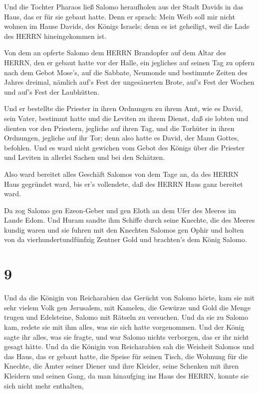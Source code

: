  Und die Tochter Pharaos ließ Salomo heraufholen aus der
Stadt Davids in das Haus, das er für sie gebaut hatte. Denn er sprach:
Mein Weib soll mir nicht wohnen im Hause Davids, des Königs Israels;
denn es ist geheiligt, weil die Lade des HERRN hineingekommen ist.

 Von dem an opferte Salomo dem HERRN Brandopfer auf dem
Altar des HERRN, den er gebaut hatte vor der Halle,  ein
jegliches auf seinen Tag zu opfern nach dem Gebot Mose's, auf die
Sabbate, Neumonde und bestimmte Zeiten des Jahres dreimal, nämlich auf's
Fest der ungesäuerten Brote, auf's Fest der Wochen und auf's Fest der
Laubhütten.

 Und er bestellte die Priester in ihren Ordnungen zu ihrem
Amt, wie es David, sein Vater, bestimmt hatte und die Leviten zu ihrem
Dienst, daß sie lobten und dienten vor den Priestern, jegliche auf ihren
Tag, und die Torhüter in ihren Ordnungen, jegliche auf ihr Tor; denn
also hatte es David, der Mann Gottes, befohlen.  Und es
ward nicht gewichen vom Gebot des Königs über die Priester und Leviten
in allerlei Sachen und bei den Schätzen.

 Also ward bereitet alles Geschäft Salomos von dem Tage an,
da des HERRN Haus gegründet ward, bis er's vollendete, daß des HERRN
Haus ganz bereitet ward.

 Da zog Salomo gen Ezeon-Geber und gen Eloth an dem Ufer
des Meeres im Lande Edom.  Und Huram sandte ihm Schiffe
durch seine Knechte, die des Meeres kundig waren und sie fuhren mit den
Knechten Salomos gen Ophir und holten von da vierhundertundfünfzig
Zentner Gold und brachten's dem König Salomo.

\hypertarget{section-8}{%
\section{9}\label{section-8}}

 Und da die Königin von Reicharabien das Gerücht von Salomo
hörte, kam sie mit sehr vielem Volk gen Jerusalem, mit Kamelen, die
Gewürze und Gold die Menge trugen und Edelsteine, Salomo mit Rätseln zu
versuchen. Und da sie zu Salomo kam, redete sie mit ihm alles, was sie
sich hatte vorgenommen.  Und der König sagte ihr alles, was
sie fragte, und war Salomo nichts verborgen, das er ihr nicht gesagt
hätte.  Und da die Königin von Reicharabien sah die Weisheit
Salomos und das Haus, das er gebaut hatte,  die Speise für
seinen Tisch, die Wohnung für die Knechte, die Ämter seiner Diener und
ihre Kleider, seine Schenken mit ihren Kleidern und seinen Gang, da man
hinaufging ins Haus des HERRN, konnte sie sich nicht mehr enthalten,


